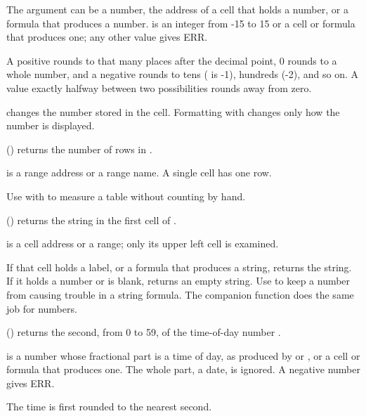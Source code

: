 The argument  can be a number, the address of a cell that holds a number, or a formula that produces a number.  is an integer from -15 to 15 or a cell or formula that produces one; any other value gives ERR.

A positive  rounds to that many places after the decimal point, 0 rounds to a whole number, and a negative  rounds to tens ( is -1), hundreds (-2), and so on. A value exactly halfway between two possibilities rounds away from zero.

\begin{Note}
 changes the number stored in the cell. Formatting with  changes only how the number is displayed.
\end{Note}

\Examples
{}

() returns the number of rows in .

 is a range address or a range name. A single cell has one row.

Use  with  to measure a table without counting by hand.

\Examples
{}

() returns the string in the first cell of .

 is a cell address or a range; only its upper left cell is examined.

If that cell holds a label, or a formula that produces a string,  returns the string. If it holds a number or is blank,  returns an empty string. Use  to keep a number from causing trouble in a string formula. The companion function  does the same job for numbers.

\Examples
{}

() returns the second, from 0 to 59, of the time-of-day number .

 is a number whose fractional part is a time of day, as produced by  or , or a cell or formula that produces one. The whole part, a date, is ignored. A negative number gives ERR.

The time is first rounded to the nearest second.

\Examples
{}

